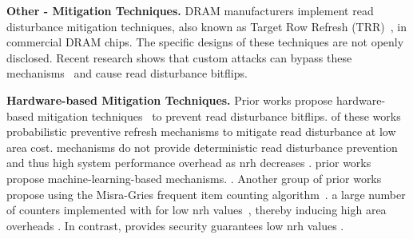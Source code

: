 \noindent
\textbf{Other - Mitigation Techniques.}
DRAM manufacturers implement read disturbance mitigation techniques, also known as Target Row Refresh (TRR)~\cite{jedec2020jesd795,jedec2017ddr4,hassan2021utrr,frigo2020trrespass}, in commercial DRAM chips.
The specific designs of these techniques are not openly disclosed.
Recent research shows that custom attacks can bypass these mechanisms~\cite{frigo2020trrespass, hassan2021utrr, jattke2022blacksmith, deridder2021smash, van2016drammer, saroiu2022price} and cause read disturbance bitflips.

\noindent
\textbf{Hardware-based Mitigation Techniques.}
Prior works propose hardware-based mitigation techniques~\citeHardwareBasedMitigations{} to prevent read disturbance bitflips.
 of these works~\cite{kim2014flipping, you2019mrloc, son2017making, wang2021discreet,yaglikci2022hira,saroiu2022configure,kim2021hammerfilter}  probabilistic preventive refresh mechanisms to mitigate read disturbance at low area cost.
 mechanisms do not provide deterministic read disturbance prevention and thus  high system performance overhead as \gls{nrh} decreases .
 prior works~\cite{joardar2022learning, joardar2022machine, naseredini2022alarm} propose machine-learning-based mechanisms.
.
Another group of prior works~\cite{seyedzadeh2017cbt, seyedzadeh2018cbt, kang2020cattwo, lee2019twice, saileshwar2022randomized, saxena2022aqua, kim2022mithril, marazzi2022protrr, park2020graphene, woo2022scalable, olgun2024abacus} propose using the Misra-Gries frequent item counting algorithm~\cite{misra1982finding}.
 a large number of counters implemented with  for low \gls{nrh} values~\cite{olgun2024abacus, bostanci2024comet}, thereby inducing high  area overheads .
In contrast, \X{} provides  security guarantees  low \gls{nrh} values  .

